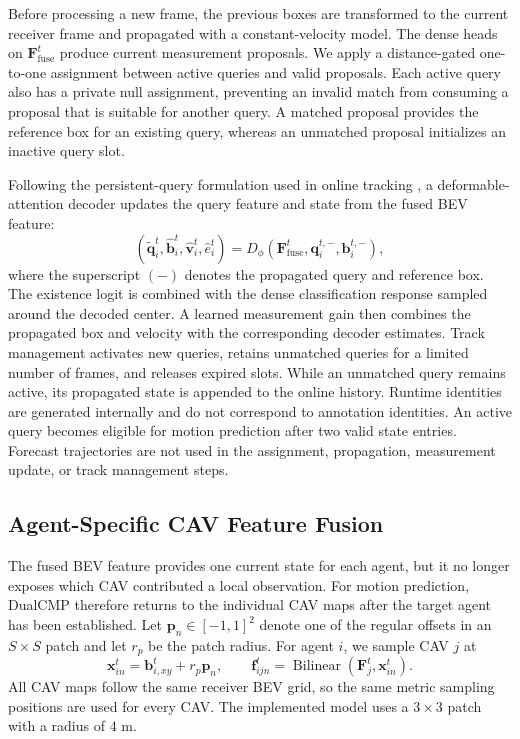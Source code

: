 \documentclass[lettersize,journal]{IEEEtran}
\begin{document}
Before processing a new frame, the previous boxes are transformed to the current receiver frame and propagated with a constant-velocity model. The dense heads on \(\mathbf{F}_{\mathrm{fuse}}^t\) produce current measurement proposals. We apply a distance-gated one-to-one assignment between active queries and valid proposals. Each active query also has a private null assignment, preventing an invalid match from consuming a proposal that is suitable for another query. A matched proposal provides the reference box for an existing query, whereas an unmatched proposal initializes an inactive query slot.

Following the persistent-query formulation used in online tracking \cite{gu2023vip3d}, a deformable-attention decoder updates the query feature and state from the fused BEV feature:
\[
(\widetilde{\mathbf{q}}_i^t,
\widehat{\mathbf{b}}_i^t,
\widehat{\mathbf{v}}_i^t,
\widehat e_i^t)
=D_\phi
\left(
\mathbf{F}_{\mathrm{fuse}}^t,
\mathbf{q}_i^{t,-},
\mathbf{b}_i^{t,-}
\right),
\tag{4}
\]
where the superscript \((- )\) denotes the propagated query and reference box. The existence logit is combined with the dense classification response sampled around the decoded center. A learned measurement gain then combines the propagated box and velocity with the corresponding decoder estimates. Track management activates new queries, retains unmatched queries for a limited number of frames, and releases expired slots. While an unmatched query remains active, its propagated state is appended to the online history. Runtime identities are generated internally and do not correspond to annotation identities. An active query becomes eligible for motion prediction after two valid state entries. Forecast trajectories are not used in the assignment, propagation, measurement update, or track management steps.

\subsection{Agent-Specific CAV Feature Fusion}

The fused BEV feature provides one current state for each agent, but it no longer exposes which CAV contributed a local observation. For motion prediction, DualCMP therefore returns to the individual CAV maps after the target agent has been established. Let \(\mathbf{p}_n\in[-1,1]^2\) denote one of the regular offsets in an \(S\times S\) patch and let \(r_p\) be the patch radius. For agent \(i\), we sample CAV \(j\) at
\[
\mathbf{x}_{in}^t=\mathbf{b}_{i,xy}^t+r_p\mathbf{p}_n,
\qquad
\mathbf{f}_{ijn}^t=
\operatorname{Bilinear}\!\left(\mathbf{F}_j^t,\mathbf{x}_{in}^t\right).
\tag{5}
\]
All CAV maps follow the same receiver BEV grid, so the same metric sampling positions are used for every CAV. The implemented model uses a \(3\times3\) patch with a radius of \(4\) m.
\end{document}
